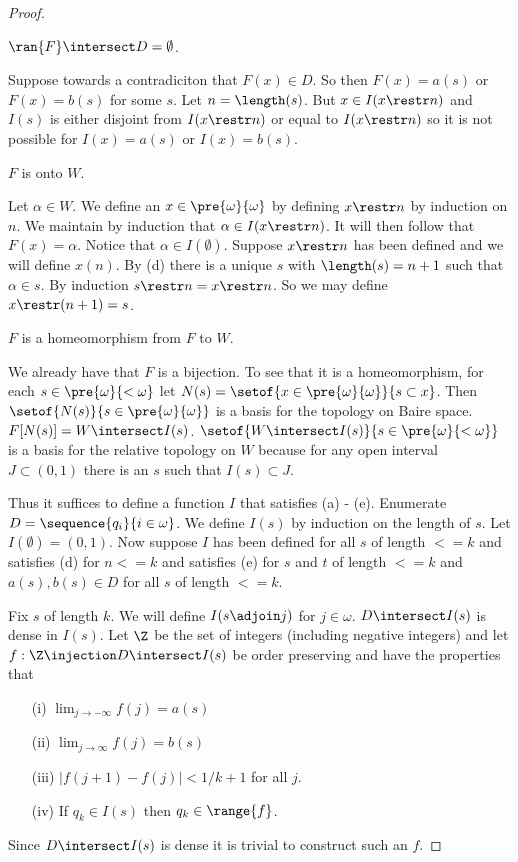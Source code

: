 \documentclass[oneside,12pt]{amsart}
\begin{document}
\begin{proof}
\begin{claim}
$\ran{F} \intersect D = \emptyset$.
\end{claim}
\begin{subproof}
Suppose towards a contradiciton that $F(x)\in D$. So then $F(x) = a(s)$ or
$F(x) = b(s)$ for some $s$.
Let $n=\length(s)$. But $x\in I(x\restr n)$ and $I(s)$ is either disjoint
from $I(x\restr n)$ or equal to $I(x\restr n)$ so it is not possible for
$I(x) = a(s)$ or $I(x) = b(s)$.
\end{subproof}

\begin{claim}
$F$ is onto $W$.
\end{claim}
\begin{subproof}
Let $\alpha\in W$. We define an $x\in \pre{\omega}{\omega}$ by defining $x\restr n$
by induction on $n$.
We maintain by induction that $\alpha\in I(x\restr n)$.
It will then follow that $F(x) = \alpha$.
Notice that $\alpha \in I(\emptyset)$.
Suppose $x\restr n$ has been defined and we will define $x(n)$.
By (d) there is a unique $s$ with $\length(s) = n + 1$ such that $\alpha \in s$.
By induction $s\restr n = x\restr n$. So we may define $x\restr (n+1) = s$.
\end{subproof}

\begin{claim}
$F$ is a homeomorphism from $F$ to $W$.
\end{claim}
\begin{subproof}
We already have that $F$ is a bijection. To see that it is a homeomorphism, for
each $s\in\pre{\omega}{<\omega}$ let
$N(s) = \setof{x\in\pre{\omega}{\omega}}{s \subset x}$. Then
$\setof{N(s)}{s\in\pre{\omega}{\omega}}$ is a basis for the topology on
Baire space. $F[N(s)] = W \intersect I(s)$.
$\setof{W\intersect I(s)}{s\in\pre{\omega}{<\omega}}$ is a basis for the
relative topology on $W$ because for any open interval $J\subset (0,1)$ there
is an $s$ such that $I(s) \subset J$.
\end{subproof}

Thus it suffices to define a function $I$ that satisfies (a) - (e).
Enumerate $D = \sequence{q_i}{i\in\omega}$.
We define $I(s)$ by induction on the length of $s$. Let $I(\emptyset)=(0,1)$.
Now suppose $I$ has been defined for all $s$ of length $<= k$ and satisfies
(d) for $n <= k$ and satisfies (e) for $s$ and $t$ of length $<= k$ and $a(s),b(s) \in D$
for all $s$ of  length $<= k$.

Fix $s$ of length $k$. We will define $I(s\adjoin j)$ for $j\in\omega$. $D\intersect I(s)$
is dense in $I(s)$. Let $\Z$ be the set of integers (including negative integers) and let
$f:\Z\injection D\intersect I(s)$ be order preserving and have the properties that
\begin{itemize}
\item[(i)] $\lim_{j\to-\infty} f(j) = a(s)$
\item[(ii)] $\lim_{j\to\infty} f(j) = b(s)$
\item[(iii)] $|f(j+1) - f(j)| < 1/k+1$ for all $j$.
\item[(iv)] If $q_k\in I(s)$ then $q_k \in \range{f}$.
\end{itemize}
Since $D\intersect I(s)$ is dense it is trivial to construct such an $f$.


\end{proof}
\end{document}
